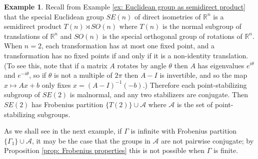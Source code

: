 \documentclass[12pt]{article}
\theoremstyle{definition}
\newtheorem{example}[theorem]{Example}
\newcommand{\bR}{\mathbb R}
\newcommand{\cA}{\mathcal{A}}
\begin{document}
\begin{example} \label{ex: special Euclidean group as Frobenius group}
Recall from Example \ref{ex: Euclidean group as semidirect product} that the special Euclidean group $SE(n)$ of direct isometries of $\bR^n$ is a semidirect product $T(n) \rtimes SO(n)$ where $T(n)$ is the normal subgroup of translations of $\bR^n$ and $SO(n)$ is the special orthogonal group of rotations of $\bR^n$.
When $n = 2$, each transformation has at most one fixed point, and a transformation has no fixed points if and only if it is a non-identity translation.
(To see this, note that if a matrix $A$ rotates by angle $\theta$ then $A$ has eigenvalues $e^{i\theta}$ and $e^{-i\theta}$, so if $\theta$ is not a multiple of $2\pi$ then $A - I$ is invertible, and so the map $x \mapsto Ax + b$ only fixes $x = (A - I)^{-1}(-b)$.)
Therefore each point-stabilizing subgroup of $SE(2)$ is malnormal, and any two stabilizers are conjugate.
Then $SE(2)$ has Frobenius partition $\{T(2)\} \cup \cA$ where $\cA$ is the set of point-stabilizing subgroups.
\end{example}


As we shall see in the next example, if $\Gamma$ is infinite with Frobenius partition $\{\Gamma_1\} \cup \cA$, it may be the case that the groups in $\cA$ are not pairwise conjugate; by Proposition \ref{prop: Frobenius properties} this is not possible when $\Gamma$ is finite.
\end{document}
